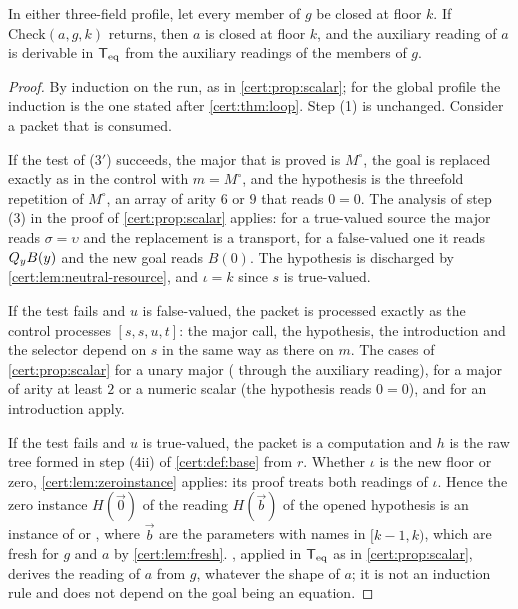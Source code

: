 \begin{theorem}\label{cert:thm:three-sound}
In either three-field profile, let every member of $g$ be closed at floor $k$.
If $\mathrm{Check}(a,g,k)$ returns, then $a$ is closed at floor $k$, and the
auxiliary reading of $a$ is derivable in $\mathsf{T}_{\mathrm{eq}}$ from the auxiliary readings of
the members of $g$.
\end{theorem}
\begin{proof}
By induction on the run, as in \cref{cert:prop:scalar}; for the global profile
the induction is the one stated after \cref{cert:thm:loop}. Step (1) is
unchanged. Consider a packet that is consumed.

If the test of (3$'$) succeeds, the major that is proved is $M^{\circ}$, the
goal is replaced exactly as in the control with $m=M^{\circ}$, and the
hypothesis is the threefold repetition of $M^{\circ}$, an array of arity $6$
or $9$ that reads $0=0$. The analysis of step (3) in the proof of
\cref{cert:prop:scalar} applies: for a true-valued source the major reads
$\sigma=\upsilon$ and the replacement is a transport, for a false-valued one
it reads $Q_{y}B(y)$ and the new goal reads $B(0)$. The hypothesis is
discharged by \cref{cert:lem:neutral-resource}, and $\iota=k$ since $s$ is
true-valued.

If the test fails and $u$ is false-valued, the packet is processed exactly as
the control processes $[s,s,u,t]$: the major call, the hypothesis, the
introduction and the selector depend on $s$ in the same way as there on $m$.
The cases of \cref{cert:prop:scalar} for a unary major ( through
the auxiliary reading), for a major of arity at least $2$ or a numeric scalar
(the hypothesis reads $0=0$), and for an introduction apply.

If the test fails and $u$ is true-valued, the packet is a computation and $h$
is the raw tree formed in step (4ii) of \cref{cert:def:base} from $r$. Whether
$\iota$ is the new floor or zero, \cref{cert:lem:zeroinstance} applies: its
proof treats both readings of $\iota$. Hence the zero instance $H(\vec 0)$ of
the reading $H(\vec b)$ of the opened hypothesis is an instance of
 or , where $\vec b$ are the parameters with names
in $[k-1,k)$, which are fresh for $g$ and $a$ by \cref{cert:lem:fresh}.
, applied in $\mathsf{T}_{\mathrm{eq}}$ as in \cref{cert:prop:scalar},
derives the reading of $a$ from $g$, whatever the shape of $a$; it is not an
induction rule and does not depend on the goal being an equation.
\end{proof}

